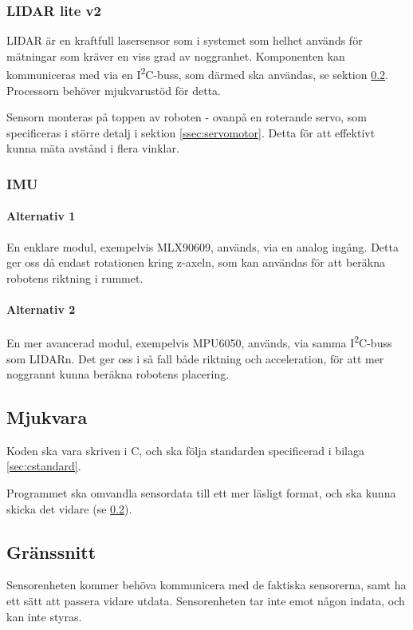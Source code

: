\documentclass[a4paper,11pt]{article}
\begin{document}
\subsubsection{LIDAR lite v2} \label{sssec:lidar}
LIDAR är en kraftfull lasersensor som i systemet som helhet används för mätningar som kräver en viss grad av noggranhet. Komponenten kan kommuniceras med via en I\textsuperscript{2}C-buss, som därmed ska användas, se sektion \ref{ssec:sensorInterface}. Processorn behöver mjukvarustöd för detta.

Sensorn monteras på toppen av roboten - ovanpå en roterande servo, som specificeras i större detalj i sektion \ref{ssec:servomotor}. Detta för att effektivt kunna mäta avstånd i flera vinklar.

\subsubsection{IMU} \label{sssec:imu}

\paragraph{Alternativ 1}
En enklare modul, exempelvis MLX90609, används, via en analog ingång. Detta ger oss då endast rotationen kring z-axeln, som kan användas för att beräkna robotens riktning i rummet.

\paragraph{Alternativ 2}
En mer avancerad modul, exempelvis MPU6050, används, via samma I\textsuperscript{2}C-buss som LIDARn. Det ger oss i så fall både riktning och acceleration, för att mer noggrannt kunna beräkna robotens placering. %

\subsection{Mjukvara}

Koden ska vara skriven i C, och ska följa standarden specificerad i bilaga \ref{sec:cstandard}.

Programmet ska omvandla sensordata till ett mer läsligt format, och ska kunna skicka det vidare (se \ref{ssec:sensorInterface}).

\subsection{Gränssnitt} \label{ssec:sensorInterface}
Sensorenheten kommer behöva kommunicera med de faktiska sensorerna, samt ha ett sätt att passera vidare utdata. Sensorenheten tar inte emot någon indata, och kan inte styras.
\end{document}
